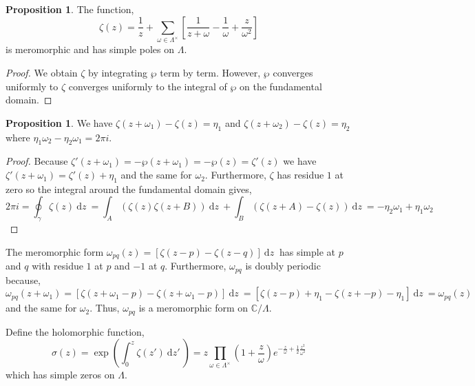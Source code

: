 \documentclass[12pt]{extarticle}
\newcommand{\C}{\mathbb{C}}
\renewcommand{\d}[1]{\: \mathrm{d}#1 \:}
\theoremstyle{definition}
\newtheorem{proposition}[theorem]{Proposition}
\newenvironment{definition}[1][Definition:]{\begin{trivlist}
\item[\hskip \labelsep {\bfseries #1}]}{\end{trivlist}}
\begin{document}
\begin{proposition}
The function,
\[ \zeta(z) = \frac{1}{z} + \sum_{\omega \in \Lambda^\times} \left[ \frac{1}{z + \omega} - \frac{1}{\omega} + \frac{z}{\omega^2} \right] \]
is meromorphic and has simple poles on $\Lambda$.
\end{proposition}

\begin{proof}
We obtain $\zeta$ by integrating $\wp$ term by term. However, $\wp$ converges uniformly to $\zeta$ converges uniformly to the integral of $\wp$ on the fundamental domain. 
\end{proof}

\begin{proposition}
We have $\zeta(z + \omega_1) - \zeta(z) = \eta_1$ and $\zeta(z + \omega_2) - \zeta(z) = \eta_2$ where $\eta_1 \omega_2  - \eta_2 \omega_1 = 2 \pi i$. 
\end{proposition}

\begin{proof}
Because $\zeta'(z + \omega_1) = - \wp(z + \omega_1) = - \wp(z) = \zeta'(z)$ we have $\zeta'(z + \omega_1) = \zeta'(z) + \eta_1$ and the same for $\omega_2$. Furthermore, $\zeta$ has residue $1$ at zero so the integral around the fundamental domain gives,
\[ 2 \pi i = \oint_{\gamma} \zeta(z) \d{z} = \int_A (\zeta(z)  \zeta(z + B)) \d{z} + \int_B (\zeta(z + A) - \zeta(z)) \d{z} = - \eta_2 \omega_1 + \eta_1 \omega_2 \]
\end{proof}

\begin{definition}
The meromorphic form $\omega_{pq}(z) = \left[ \zeta(z - p) - \zeta(z - q) \right] \d{z}$ has simple at $p$ and $q$ with residue $1$ at $p$ and $-1$ at $q$. Furthermore, $\omega_{pq}$ is doubly periodic because,
\[ \omega_{pq}(z + \omega_1) = \left[ \zeta(z + \omega_1 - p) - \zeta(z + \omega_1 - p) \right] \d{z} = \left[ \zeta(z - p) + \eta_1 - \zeta(z + - p) - \eta_1 \right] \d{z} = \omega_{pq}(z) \]
and the same for $\omega_2$. Thus, $\omega_{pq}$ is a meromorphic form on $\C / \Lambda$. 
\end{definition}


\begin{definition}
Define the holomorphic function,
\[ \sigma(z) = \exp{\left( \int_0^z \zeta(z') \d{z'} \right)} = z \prod_{\omega \in \Lambda^\times} \left( 1 + \frac{z}{\omega} \right) e^{-\frac{z}{\omega} + \tfrac{1}{2} \frac{z^2}{\omega^2}} \]
which has simple zeros on $\Lambda$.
\end{definition}
\end{document}

